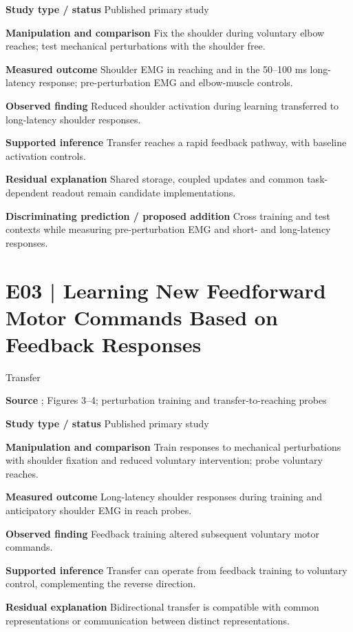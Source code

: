 \documentclass[11pt,a4paper]{article}
\begin{document}
\textbf{Study type / status} Published primary study\par
\textbf{Manipulation and comparison} Fix the shoulder during voluntary elbow reaches; test mechanical perturbations with the shoulder free.\par
\textbf{Measured outcome} Shoulder EMG in reaching and in the 50--100 ms long-latency response; pre-perturbation EMG and elbow-muscle controls.\par
\textbf{Observed finding} Reduced shoulder activation during learning transferred to long-latency shoulder responses.\par
\textbf{Supported inference} Transfer reaches a rapid feedback pathway, with baseline activation controls.\par
\textbf{Residual explanation} Shared storage, coupled updates and common task-dependent readout remain candidate implementations.\par
\textbf{Discriminating prediction / proposed addition} Cross training and test contexts while measuring pre-perturbation EMG and short- and long-latency responses.\par
\clearpage\section{E03 | Learning New Feedforward Motor Commands Based on Feedback Responses}
{\small\sffamily\color{navy} Transfer}\par
\textbf{Source} \cite{maeda2020}; Figures 3--4; perturbation training and transfer-to-reaching probes\par
\textbf{Study type / status} Published primary study\par
\textbf{Manipulation and comparison} Train responses to mechanical perturbations with shoulder fixation and reduced voluntary intervention; probe voluntary reaches.\par
\textbf{Measured outcome} Long-latency shoulder responses during training and anticipatory shoulder EMG in reach probes.\par
\textbf{Observed finding} Feedback training altered subsequent voluntary motor commands.\par
\textbf{Supported inference} Transfer can operate from feedback training to voluntary control, complementing the reverse direction.\par
\textbf{Residual explanation} Bidirectional transfer is compatible with common representations or communication between distinct representations.\par
\end{document}
